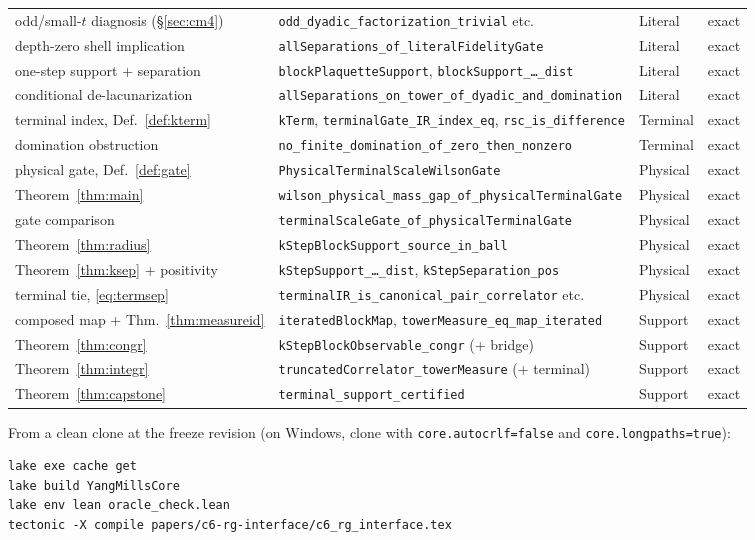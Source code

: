 \documentclass[11pt]{article}
\theoremstyle{definition}
\newcommand{\lean}[1]{\texttt{#1}}
\begin{document}
\begin{center}
\begin{tabular}{@{}llll@{}}
odd/small-$t$ diagnosis (\S\ref{sec:cm4}) & \lean{odd\_dyadic\_factorization\_trivial} etc. & Literal & exact \\
depth-zero shell implication & \lean{allSeparations\_of\_literalFidelityGate} & Literal & exact \\
one-step support + separation & \lean{blockPlaquetteSupport}, \lean{blockSupport\_\dots\_dist} & Literal & exact \\
conditional de-lacunarization & \lean{allSeparations\_on\_tower\_of\_dyadic\_and\_domination} & Literal & exact \\
terminal index, Def.~\ref{def:kterm} & \lean{kTerm}, \lean{terminalGate\_IR\_index\_eq}, \lean{rsc\_is\_difference} & Terminal & exact \\
domination obstruction & \lean{no\_finite\_domination\_of\_zero\_then\_nonzero} & Terminal & exact \\
physical gate, Def.~\ref{def:gate} & \lean{PhysicalTerminalScaleWilsonGate} & Physical & exact \\
Theorem~\ref{thm:main} & \lean{wilson\_physical\_mass\_gap\_of\_physicalTerminalGate} & Physical & exact \\
gate comparison & \lean{terminalScaleGate\_of\_physicalTerminalGate} & Physical & exact \\
Theorem~\ref{thm:radius} & \lean{kStepBlockSupport\_source\_in\_ball} & Physical & exact \\
Theorem~\ref{thm:ksep} + positivity & \lean{kStepSupport\_\dots\_dist}, \lean{kStepSeparation\_pos} & Physical & exact \\
terminal tie, \eqref{eq:termsep} & \lean{terminalIR\_is\_canonical\_pair\_correlator} etc. & Physical & exact \\
composed map + Thm.~\ref{thm:measureid} & \lean{iteratedBlockMap}, \lean{towerMeasure\_eq\_map\_iterated} & Support & exact \\
Theorem~\ref{thm:congr} & \lean{kStepBlockObservable\_congr} (+ bridge) & Support & exact \\
Theorem~\ref{thm:integr} & \lean{truncatedCorrelator\_towerMeasure} (+ terminal) & Support & exact \\
Theorem~\ref{thm:capstone} & \lean{terminal\_support\_certified} & Support & exact \\
\bottomrule
\end{tabular}
\end{center}

\medskip
\noindent From a clean clone at the freeze revision (on Windows, clone
with \lean{core.autocrlf=false} and \lean{core.longpaths=true}):
\begin{verbatim}
lake exe cache get
lake build YangMillsCore
lake env lean oracle_check.lean
tectonic -X compile papers/c6-rg-interface/c6_rg_interface.tex
\end{verbatim}
\end{document}

